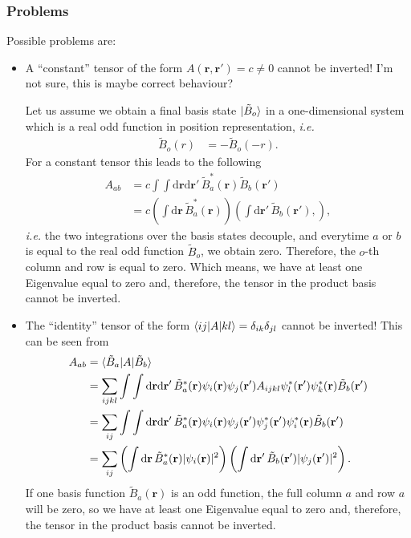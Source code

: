 \documentclass[12pt,a4paper]{scrartcl}
\numberwithin{equation}{section}
\newcommand{\cng}[1]{{\color{red}#1}}
\renewcommand{\vec}{\mathbf}
\begin{document}
\subsubsection{Problems}
Possible problems are:
\begin{itemize}
 \item A ``constant'' tensor of the form $A(\vec{r},\vec{r}')=c\neq 0$ cannot be inverted! 
 \cng{I'm not sure, this is maybe correct behaviour?}

 Let us assume we obtain a final basis state $\ket{\tilde{B}_o}$ in a one-dimensional system
 which is a real odd function in position representation, \textit{i.e.}
 \begin{align}
  \tilde{B}_o(r) &= -\tilde{B}_o(-r).
 \end{align}
For a constant tensor this leads to the following
 \begin{align}
A_{ab}
&=c \int \int \mathrm{d}\vec{r}\mathrm{d}\vec{r}' \,  \tilde{B}^*_a(\vec{r})  \tilde{B}_b(\vec{r}') \\
&=c \left(\int \mathrm{d}\vec{r} \, \tilde{B}^*_a(\vec{r}) \right) \left( \int \mathrm{d}\vec{r}'\,  \tilde{B}_b(\vec{r}'), \right),   
\end{align}
\textit{i.e.} the two integrations over the basis states decouple, and everytime $a$ or $b$ is equal to the
real odd function $\tilde{B}_o$, we obtain zero. Therefore, the $o$-th column and row is equal to zero.
Which means, we have at least one Eigenvalue equal to zero and, therefore, the tensor
in the product basis cannot be inverted.

\item The ``identity'' tensor of the form $\braket{ij|A|kl}=\delta_{ik}\delta_{jl}$ 
cannot be inverted! 
This can be seen from
\begin{align}
A_{ab}
&= \braket{ \tilde{B}_a | A | \tilde{B}_b } \\
&=\sum_{ijkl} \int \int \mathrm{d}\vec{r}\mathrm{d}\vec{r}' \,  \tilde{B}^*_a(\vec{r})  
    \psi_i(\vec{r})\psi_j(\vec{r}') A_{ijkl} \psi^*_l(\vec{r}')\psi^*_k(\vec{r}) \tilde{B}_b(\vec{r}') \\
 &=\sum_{ij} \int \int \mathrm{d}\vec{r}\mathrm{d}\vec{r}' \,  \tilde{B}^*_a(\vec{r})  
 \psi_i(\vec{r})\psi_j(\vec{r}') \psi^*_j(\vec{r}')\psi^*_i(\vec{r}) \tilde{B}_b(\vec{r}') \\
  &=\sum_{ij} \left(\int \mathrm{d}\vec{r} \,  \tilde{B}^*_a(\vec{r})  
 |\psi_i(\vec{r})|^2 \right)
 \left(\int \mathrm{d}\vec{r}' \,  \tilde{B}_b(\vec{r}')  
 |\psi_j(\vec{r}')|^2 \right).
\end{align}
 If one basis function $\tilde{B}_a(\vec{r})$ is an odd function, 
 the full column $a$ and row $a$ will be zero, so 
 we have at least one Eigenvalue equal to zero and, therefore, the tensor
in the product basis cannot be inverted.
\end{itemize}
\end{document}
